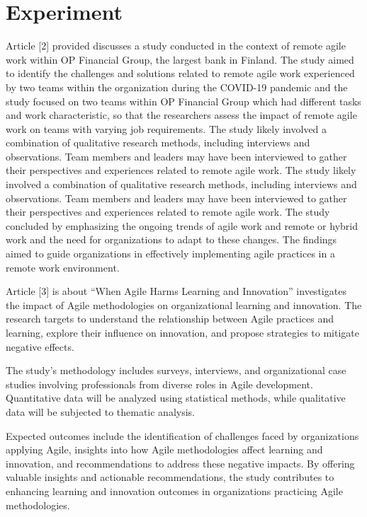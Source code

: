 \documentclass[conference]{IEEEtran}
\begin{document}
\section{Experiment}
Article [2] provided discusses a study conducted in the context of remote agile work within OP Financial Group, the largest bank in Finland. The study aimed to identify the challenges and solutions related to remote agile work experienced by two teams within the organization during the COVID-19 pandemic and the study focused on two teams within OP Financial Group which had different tasks and work characteristic, so that the researchers assess the impact of remote agile work on teams with varying job requirements. The study likely involved a combination of qualitative research methods, including interviews and observations. Team members and leaders may have been interviewed to gather their perspectives and experiences related to remote agile work. The study likely involved a combination of qualitative research methods, including interviews and observations. Team members and leaders may have been interviewed to gather their perspectives and experiences related to remote agile work. The study concluded by emphasizing the ongoing trends of agile work and remote or hybrid work and the need for organizations to adapt to these changes. The findings aimed to guide organizations in effectively implementing agile practices in a remote work environment.

Article [3] is about “When Agile Harms Learning and Innovation” investigates the impact of Agile methodologies on organizational learning and innovation. The research targets to understand the relationship between Agile practices and learning, explore their influence on innovation, and propose strategies to mitigate negative effects.

The study's methodology includes surveys, interviews, and organizational case studies involving professionals from diverse roles in Agile development. Quantitative data will be analyzed using statistical methods, while qualitative data will be subjected to thematic analysis.

Expected outcomes include the identification of challenges faced by organizations applying Agile, insights into how Agile methodologies affect learning and innovation, and recommendations to address these negative impacts. By offering valuable insights and actionable recommendations, the study contributes to enhancing learning and innovation outcomes in organizations practicing Agile methodologies.
\end{document}
